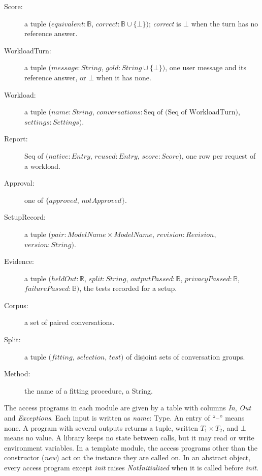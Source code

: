 \documentclass[12pt, titlepage]{article}
\begin{document}
\begin{description}
\item[Score:] a tuple $(\mathit{equivalent}: \mathbb{B}$, $\mathit{correct}: \mathbb{B}
  \cup \{\bot\})$; \emph{correct} is $\bot$ when the turn has no reference answer.
\item[WorkloadTurn:] a tuple $(\mathit{message}: \mathit{String}$, $\mathit{gold}:
  \mathit{String} \cup \{\bot\})$, one user message and its reference answer, or
  $\bot$ when it has none.
\item[Workload:] a tuple $(\mathit{name}: \mathit{String}$, $\mathit{conversations}:
  \text{Seq of (Seq of WorkloadTurn)}$, $\mathit{settings}: \mathit{Settings})$.
\item[Report:] Seq of $(\mathit{native}: \mathit{Entry}$, $\mathit{reused}:
  \mathit{Entry}$, $\mathit{score}: \mathit{Score})$, one row per request of a
  workload.
\item[Approval:] one of $\{\mathit{approved}$, $\mathit{notApproved}\}$.
\item[SetupRecord:] a tuple $(\mathit{pair}: \mathit{ModelName} \times \mathit{ModelName}$, $\mathit{revision}: \mathit{Revision}$, $\mathit{version}: \mathit{String})$.
\item[Evidence:] a tuple $(\mathit{heldOut}: \mathbb{R}$, $\mathit{split}: \mathit{String}$, $\mathit{outputPassed}: \mathbb{B}$, $\mathit{privacyPassed}: \mathbb{B}$, $\mathit{failurePassed}: \mathbb{B})$, the tests recorded for a setup.
\item[Corpus:] a set of paired conversations.
\item[Split:] a tuple $(\mathit{fitting}$, $\mathit{selection}$, $\mathit{test})$ of
  disjoint sets of conversation groups.
\item[Method:] the name of a fitting procedure, a String.
\end{description}

The access programs in each module are given by a table with columns \emph{In},
\emph{Out} and \emph{Exceptions}. Each input is written as \emph{name}: Type. An
entry of ``--'' means none. A program with several outputs returns a tuple,
written $T_1 \times T_2$, and $\bot$ means no value. A library keeps no state
between calls, but it may read or write environment variables. In a template module, the access programs other than
the constructor (\emph{new}) act on the instance they are called on. In an
abstract object, every access program except \emph{init} raises
\emph{NotInitialized} when it is called before \emph{init}.
\end{document}
